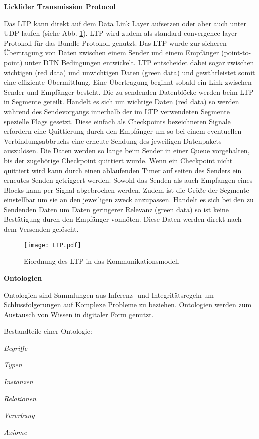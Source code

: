 
\textbf{Licklider Transmission Protocol}

Das LTP kann direkt auf dem Data Link Layer aufsetzen oder aber auch unter UDP
laufen (siehe Abb. \ref{fig:LTP}). LTP wird zudem als standard convergence layer
Protokoll f{\"u}r das Bundle Protokoll genutzt. Das LTP wurde zur sicheren {\"U}bertragung von Daten
zwischen einem Sender und einem Empf{\"a}nger (point-to-point) unter DTN Bedingungen entwickelt. LTP entscheidet dabei sogar zwischen wichtigen
(red data) und unwichtigen Daten (green data) und gew{\"a}hrleistet somit eine
effiziente {\"U}bermittlung. Eine {\"U}bertragung beginnt sobald ein Link zwischen Sender und Empf{\"a}nger
besteht. Die zu sendenden Datenbl{\"o}cke werden beim LTP in Segmente
geteilt. Handelt es sich um wichtige Daten (red data) so werden w{\"a}hrend des
Sendevorgangs innerhalb der im LTP verwendeten Segmente spezielle Flags gesetzt.
Diese einfach als Checkpoints bezeichneten Signale erfordern eine Quittierung durch den Empf{\"a}nger um so bei einem eventuellen
Verbindungsabbruchs eine erneute Sendung des jeweiligen Datenpakets
auszul{\"o}sen. Die Daten werden so lange beim Sender in einer Queue
vorgehalten, bis der zugeh{\"o}rige Checkpoint quittiert wurde. Wenn ein
Checkpoint nicht quittiert wird kann durch einen ablaufenden Timer auf seiten
des Senders ein erneutes Senden getriggert werden. Sowohl das Senden als auch
Empfangen eines Blocks kann per Signal abgebrochen werden. Zudem ist die
Gr{\"o}{\ss}e der Segmente einstellbar um sie an den jeweiligen zweck
anzupassen. Handelt es sich bei den zu Sendenden Daten um Daten geringerer
Relevanz (green data) so ist keine Best{\"a}tigung durch den Empf{\"a}nger
vonn{\"o}ten.
Diese Daten werden direkt nach dem Versenden gel{\"o}scht.

\begin{figure}[H]
\centering
\texttt{[image: LTP.pdf]}
\caption{Eiordnung des LTP in das Kommunikationsmodell}
\label{fig:LTP}
\end{figure}

\textbf{Ontologien}

Ontologien sind Sammlungen aus Inferenz- und Integrit{\"a}tsregeln um
Schlussfolgerungen auf Komplexe Probleme zu beziehen. Ontologien werden zum
Austausch von Wissen in digitaler Form genutzt.

Bestandteile einer Ontologie:

 \begin{compactenum}[I]
     \item \textit{Begriffe}
     \item \textit{Typen}
     \item \textit{Instanzen}
     \item \textit{Relationen}
     \item \textit{Vererbung}
     \item \textit{Axiome}
   \end{compactenum}









